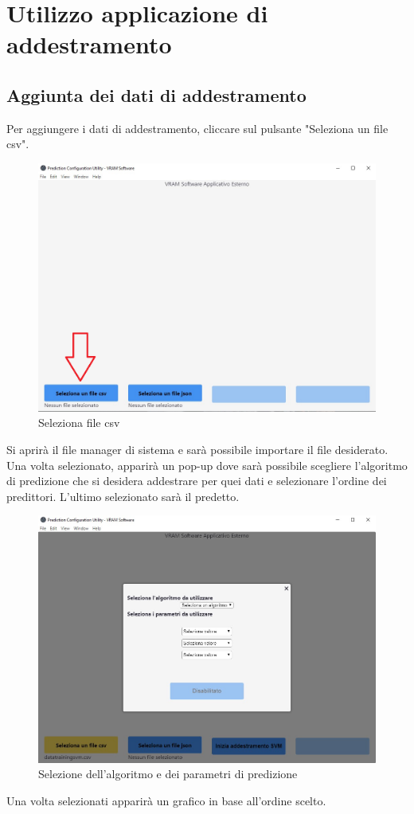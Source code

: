 \section{Utilizzo applicazione di addestramento}
	\subsection{Aggiunta dei dati di addestramento}
	Per aggiungere i dati di addestramento, cliccare sul pulsante "Seleziona un file csv".
	\begin{figure}[H] 	
		\begin{center}
			\includegraphics[width=\linewidth]{img/1.png}
		\end{center}
		\caption{Seleziona file csv}	
	\end{figure}
	Si aprirà il file manager di sistema e sarà possibile importare il file desiderato. Una volta selezionato, apparirà un pop-up dove sarà possibile scegliere l'algoritmo di predizione che si desidera addestrare per quei dati e selezionare l'ordine dei predittori. L'ultimo selezionato sarà il predetto.
	\begin{figure}[H] 	
		\begin{center}
			\includegraphics[width=\linewidth]{img/2.jpg}
		\end{center}
		\caption{Selezione dell'algoritmo e dei parametri di predizione}	
	\end{figure}
	Una volta selezionati apparirà un grafico in base all'ordine scelto.
